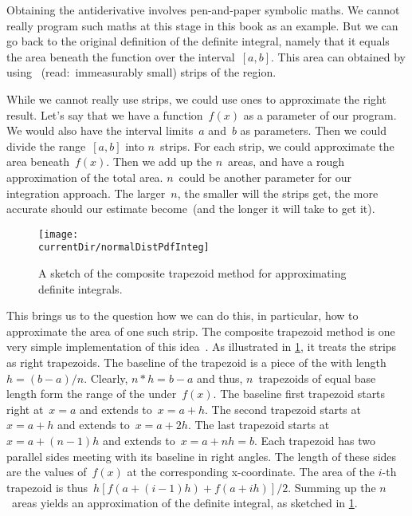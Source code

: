 Obtaining the antiderivative involves pen-and-paper symbolic maths.
We cannot really program such maths at this stage in this book as an example.
But we can go back to the original definition of the definite integral, namely that it equals the area beneath the function over the interval~$[a,b]$.
This area can obtained by using ~(read:~immeasurably small) strips of the region.

While we cannot really use  strips, we could use  ones to approximate the right result.
Let's say that we have a function~$f(x)$ as a parameter of our program.
We would also have the interval limits~$a$ and~$b$ as parameters.
Then we could divide the range~$[a,b]$ into $n$~strips.
For each strip, we could approximate the area beneath~$f(x)$.
Then we add up the $n$~areas, and have a rough approximation of the total area.
$n$~could be another parameter for our integration approach.
The larger~$n$, the smaller will the strips get, the more accurate should our estimate become~(and the longer it will take to get it).%
%
\begin{figure}%
\centering%
\texttt{[image: \\currentDir/normalDistPdfInteg]}%
\caption{A sketch of the composite trapezoid method for approximating definite integrals.}%
\label{fig:normalDistPdfInteg}%
\end{figure}%
%
%
%

This brings us to the question how we can do this, in particular, how to approximate the area of one such strip.
The composite trapezoid method is one very simple implementation of this idea~\cite{S2021ITNM:NIATROTTR,E2013AITNMAA,A1991AITNA}.
As illustrated in \cref{fig:normalDistPdfInteg}, it treats the strips as right trapezoids.
The baseline of the trapezoid is a piece of the  with length~$h=(b-a)/n$.
Clearly, $n*h=b-a$ and thus, $n$~trapezoids of equal base length form the range of the  under~$f(x)$.
The baseline first trapezoid starts right at~$x=a$ and extends to~$x=a+h$.
The second trapezoid starts at~$x=a+h$ and extends to~$x=a+2h$.
The last trapezoid starts at~$x=a+(n-1)h$ and extends to~$x=a+nh=b$.
Each trapezoid has two parallel sides meeting with its baseline in right angles.
The length of these sides are the values of~$f(x)$ at the corresponding x\nobreakdashes-coordinate.
The area of the $i$\nobreakdashes-th trapezoid is thus~$h[f(a+(i-1)h)+f(a+ih)]/2$.
Summing up the $n$~areas yields an approximation of the definite integral, as sketched in \cref{fig:normalDistPdfInteg}.

